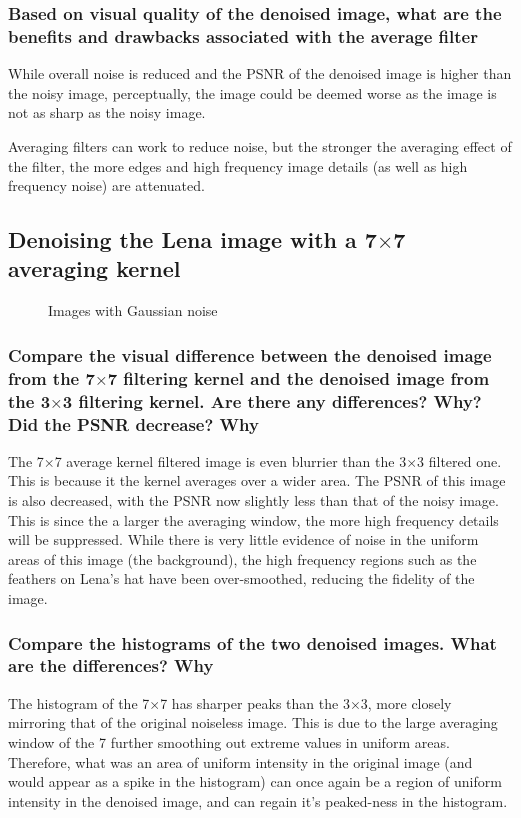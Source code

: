 \subsubsection{Based on visual quality of the denoised image, what are the benefits and drawbacks associated with the average filter}
While overall noise is reduced and the PSNR of the denoised image is higher than the noisy image, perceptually, the image could be deemed worse as the image is not as sharp as the noisy image.

Averaging filters can work to reduce noise, but the stronger the averaging effect of the filter, the more edges and high frequency image details (as well as high frequency noise) are attenuated.

\clearpage
\subsection{Denoising the Lena image with a 7$\times$7 averaging kernel}
\begin{figure}[ht]
\centering
	
	\caption{Images with Gaussian noise}
	\label{fig:gaussianNoise}
\end{figure}

\subsubsection{Compare the visual difference between the denoised image from the 7$\times$7 filtering kernel and the denoised image from the 3$\times$3 filtering kernel. Are there any differences? Why? Did the PSNR decrease? Why}

The 7$\times$7 average kernel filtered image is even blurrier than the 3$\times$3 filtered one. This is because it the kernel averages over a wider area. The PSNR of this image is also decreased, with the PSNR now slightly less than that of the noisy image. This is since the a larger the averaging window, the more high frequency details will be suppressed. While there is very little evidence of noise in the uniform areas of this image (the background), the high frequency regions such as the feathers on Lena's hat have been over-smoothed, reducing the fidelity of the image.

\subsubsection{Compare the histograms of the two denoised images. What are the differences? Why}
The histogram of the 7$\times$7 has sharper peaks than the 3$\times$3, more closely mirroring that of the original noiseless image. This is due to the large averaging window of the 7 further smoothing out extreme values in uniform areas. Therefore, what was an area of uniform intensity in the original image (and would appear as a spike in the histogram) can once again be a region of uniform intensity in the denoised image, and can regain it's peaked-ness in the histogram.


